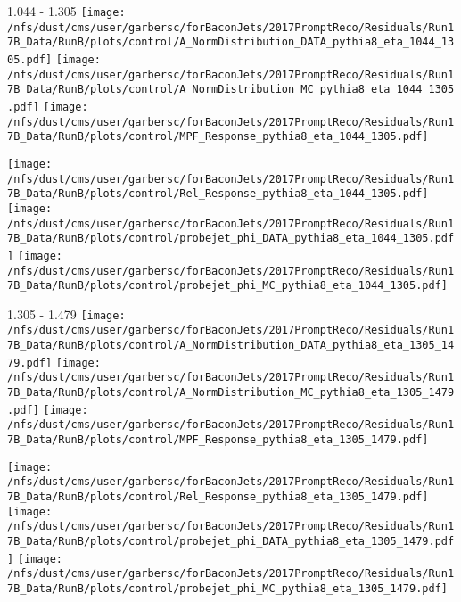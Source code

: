 \documentclass[t,compress]{beamer}
\begin{document}
\begin{frame}{1.044 - 1.305}
	\texttt{[image: /nfs/dust/cms/user/garbersc/forBaconJets/2017PromptReco/Residuals/Run17B\_Data/RunB/plots/control/A\_NormDistribution\_DATA\_pythia8\_eta\_1044\_1305.pdf]}
	\texttt{[image: /nfs/dust/cms/user/garbersc/forBaconJets/2017PromptReco/Residuals/Run17B\_Data/RunB/plots/control/A\_NormDistribution\_MC\_pythia8\_eta\_1044\_1305.pdf]}
	\texttt{[image: /nfs/dust/cms/user/garbersc/forBaconJets/2017PromptReco/Residuals/Run17B\_Data/RunB/plots/control/MPF\_Response\_pythia8\_eta\_1044\_1305.pdf]}
\newline

	\texttt{[image: /nfs/dust/cms/user/garbersc/forBaconJets/2017PromptReco/Residuals/Run17B\_Data/RunB/plots/control/Rel\_Response\_pythia8\_eta\_1044\_1305.pdf]}
	\texttt{[image: /nfs/dust/cms/user/garbersc/forBaconJets/2017PromptReco/Residuals/Run17B\_Data/RunB/plots/control/probejet\_phi\_DATA\_pythia8\_eta\_1044\_1305.pdf]}
	\texttt{[image: /nfs/dust/cms/user/garbersc/forBaconJets/2017PromptReco/Residuals/Run17B\_Data/RunB/plots/control/probejet\_phi\_MC\_pythia8\_eta\_1044\_1305.pdf]}
\end{frame}

\begin{frame}{1.305 - 1.479}
	\texttt{[image: /nfs/dust/cms/user/garbersc/forBaconJets/2017PromptReco/Residuals/Run17B\_Data/RunB/plots/control/A\_NormDistribution\_DATA\_pythia8\_eta\_1305\_1479.pdf]}
	\texttt{[image: /nfs/dust/cms/user/garbersc/forBaconJets/2017PromptReco/Residuals/Run17B\_Data/RunB/plots/control/A\_NormDistribution\_MC\_pythia8\_eta\_1305\_1479.pdf]}
	\texttt{[image: /nfs/dust/cms/user/garbersc/forBaconJets/2017PromptReco/Residuals/Run17B\_Data/RunB/plots/control/MPF\_Response\_pythia8\_eta\_1305\_1479.pdf]}
\newline

	\texttt{[image: /nfs/dust/cms/user/garbersc/forBaconJets/2017PromptReco/Residuals/Run17B\_Data/RunB/plots/control/Rel\_Response\_pythia8\_eta\_1305\_1479.pdf]}
	\texttt{[image: /nfs/dust/cms/user/garbersc/forBaconJets/2017PromptReco/Residuals/Run17B\_Data/RunB/plots/control/probejet\_phi\_DATA\_pythia8\_eta\_1305\_1479.pdf]}
	\texttt{[image: /nfs/dust/cms/user/garbersc/forBaconJets/2017PromptReco/Residuals/Run17B\_Data/RunB/plots/control/probejet\_phi\_MC\_pythia8\_eta\_1305\_1479.pdf]}
\end{frame}
\end{document}
